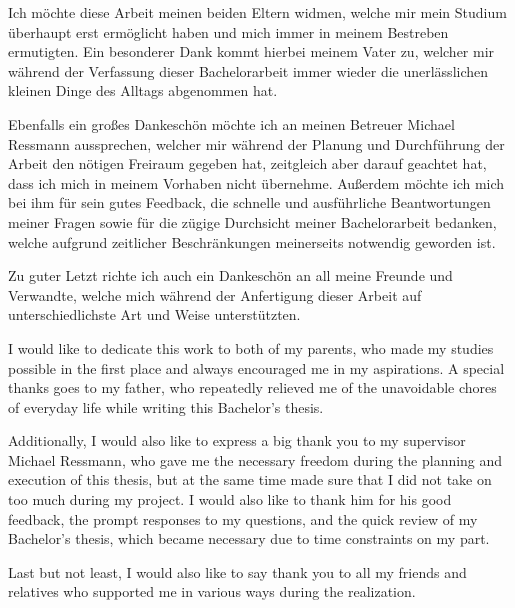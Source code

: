 \documentclass[draft,final]{vutinfth} %
\begin{document}
    \frontmatter %

    \addstatementpage

    \begin{danksagung*}

        Ich möchte diese Arbeit meinen beiden Eltern widmen, welche mir mein Studium überhaupt erst ermöglicht haben und mich immer in meinem Bestreben ermutigten.
        Ein besonderer Dank kommt hierbei meinem Vater zu, welcher mir während der Verfassung dieser Bachelorarbeit immer wieder die unerlässlichen kleinen Dinge des Alltags abgenommen hat.

        Ebenfalls ein großes Dankeschön möchte ich an meinen Betreuer Michael Ressmann aussprechen, welcher mir während der Planung und Durchführung der Arbeit den nötigen Freiraum gegeben hat, zeitgleich aber darauf geachtet hat, dass ich mich in meinem Vorhaben nicht übernehme.
        Außerdem möchte ich mich bei ihm für sein gutes Feedback, die schnelle und ausführliche Beantwortungen meiner Fragen sowie für die zügige Durchsicht meiner Bachelorarbeit bedanken, welche aufgrund zeitlicher Beschränkungen meinerseits notwendig geworden ist.

        Zu guter Letzt richte ich auch ein Dankeschön an all meine Freunde und Verwandte, welche mich während der Anfertigung dieser Arbeit auf unterschiedlichste Art und Weise unterstützten.

    \end{danksagung*}

    \begin{acknowledgements*}
        I would like to dedicate this work to both of my parents, who made my studies possible in the first place and always encouraged me in my aspirations.
        A special thanks goes to my father, who repeatedly relieved me of the unavoidable chores of everyday life while writing this Bachelor's thesis.

        Additionally, I would also like to express a big thank you to my supervisor Michael Ressmann, who gave me the necessary freedom during the planning and execution of this thesis, but at the same time made sure that I did not take on too much during my project.
        I would also like to thank him for his good feedback, the prompt responses to my questions, and the quick review of my Bachelor's thesis, which became necessary due to time constraints on my part.

        Last but not least, I would also like to say thank you to all my friends and relatives who supported me in various ways during the realization.

    \end{acknowledgements*}
\end{document}
